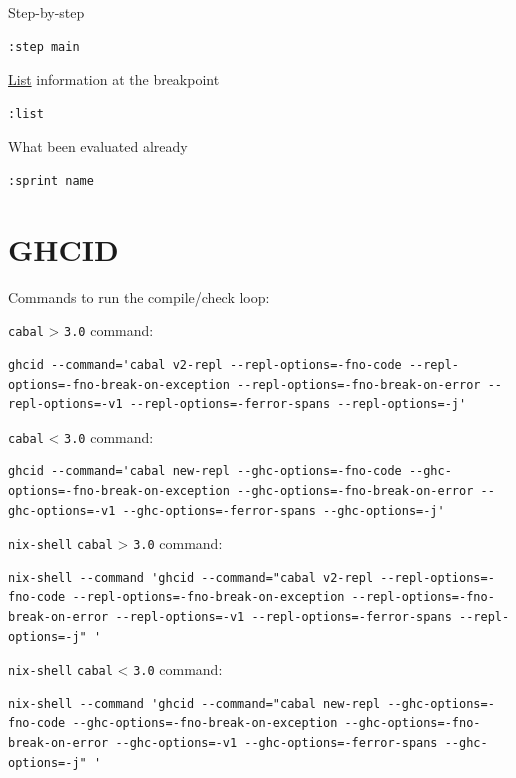 \documentclass[a4paper,14pt,oneside]{book}
\begin{document}
Step-by-step
\begin{verbatim}
:step main
\end{verbatim}

\hyperref[org104d7a1]{List} information at the breakpoint
\begin{verbatim}
:list
\end{verbatim}

What been evaluated already
\begin{verbatim}
:sprint name
\end{verbatim}

\chapter{\label{org073741c}GHCID}
\label{sec:org87422a4}

Commands to run the compile/check loop:

\texttt{cabal} > \texttt{3.0} command:
\begin{verbatim}
ghcid --command='cabal v2-repl --repl-options=-fno-code --repl-options=-fno-break-on-exception --repl-options=-fno-break-on-error --repl-options=-v1 --repl-options=-ferror-spans --repl-options=-j'
\end{verbatim}

\texttt{cabal} < \texttt{3.0} command:
\begin{verbatim}
ghcid --command='cabal new-repl --ghc-options=-fno-code --ghc-options=-fno-break-on-exception --ghc-options=-fno-break-on-error --ghc-options=-v1 --ghc-options=-ferror-spans --ghc-options=-j'
\end{verbatim}

\texttt{nix-shell} \texttt{cabal} > \texttt{3.0} command:
\begin{verbatim}
nix-shell --command 'ghcid --command="cabal v2-repl --repl-options=-fno-code --repl-options=-fno-break-on-exception --repl-options=-fno-break-on-error --repl-options=-v1 --repl-options=-ferror-spans --repl-options=-j" '
\end{verbatim}

\texttt{nix-shell} \texttt{cabal} < \texttt{3.0} command:
\begin{verbatim}
nix-shell --command 'ghcid --command="cabal new-repl --ghc-options=-fno-code --ghc-options=-fno-break-on-exception --ghc-options=-fno-break-on-error --ghc-options=-v1 --ghc-options=-ferror-spans --ghc-options=-j" '

\end{verbatim}
\end{document}
